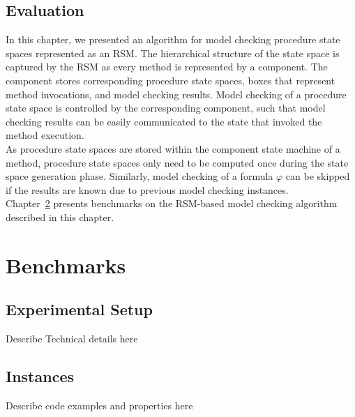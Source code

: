 \documentclass[a4paper, 12pt, twoside]{report}
\begin{document}
	\section{Evaluation}
	
	
	In this chapter, we presented an algorithm for model checking procedure state spaces represented as an RSM. The hierarchical structure of the state space is captured by the RSM as every method is represented by a component. The component stores corresponding procedure state spaces, boxes that represent method invocations, and model checking results. Model checking of a procedure state space is controlled by the corresponding component, such that model checking results can be easily communicated to the state that invoked the method execution. \\
	
	
	As procedure state spaces are stored within the component state machine of a method, procedure state spaces only need to be computed once during the state space generation phase. Similarly, model checking of a formula $\varphi$ can be skipped if the results are known due to previous model checking instances.\\	
	
	
	Chapter~\ref{chp:benchmarks} presents benchmarks on the RSM-based model checking algorithm described in this chapter.
	
	\chapter{Benchmarks}\label{chp:benchmarks}	
	
	\section{Experimental Setup}
	Describe Technical details here
	
	\section{Instances}
	Describe code examples and properties here
	
\end{document}
